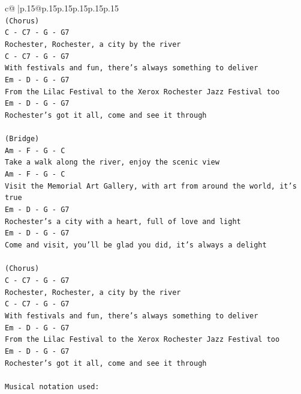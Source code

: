 \documentclass{article}
\begin{document}
{\begin{supertabular}{c@{$\;$}|p{.15\linewidth}@{}p{.15\linewidth}p{.15\linewidth}p{.15\linewidth}p{.15\linewidth}p{.15\linewidth}}
{{{\\ 
\texttt{(Chorus)} \\
\texttt{C {-} C7 {-} G {-} G7} \\
\texttt{Rochester, Rochester, a city by the river} \\
\texttt{C {-} C7 {-} G {-} G7} \\
\texttt{With festivals and fun, there's always something to deliver} \\
\texttt{Em {-} D {-} G {-} G7} \\
\texttt{From the Lilac Festival to the Xerox Rochester Jazz Festival too} \\
\texttt{Em {-} D {-} G {-} G7} \\
\texttt{Rochester's got it all, come and see it through} \\
\\ 
\texttt{(Bridge)} \\
\texttt{Am {-} F {-} G {-} C} \\
\texttt{Take a walk along the river, enjoy the scenic view} \\
\texttt{Am {-} F {-} G {-} C} \\
\texttt{Visit the Memorial Art Gallery, with art from around the world, it's true} \\
\texttt{Em {-} D {-} G {-} G7} \\
\texttt{Rochester's a city with a heart, full of love and light} \\
\texttt{Em {-} D {-} G {-} G7} \\
\texttt{Come and visit, you'll be glad you did, it's always a delight} \\
\\ 
\texttt{(Chorus)} \\
\texttt{C {-} C7 {-} G {-} G7} \\
\texttt{Rochester, Rochester, a city by the river} \\
\texttt{C {-} C7 {-} G {-} G7} \\
\texttt{With festivals and fun, there's always something to deliver} \\
\texttt{Em {-} D {-} G {-} G7} \\
\texttt{From the Lilac Festival to the Xerox Rochester Jazz Festival too} \\
\texttt{Em {-} D {-} G {-} G7} \\
\texttt{Rochester's got it all, come and see it through} \\
\\ 
\texttt{Musical notation used:} \\
}}}
\end{supertabular}}
\end{document}
